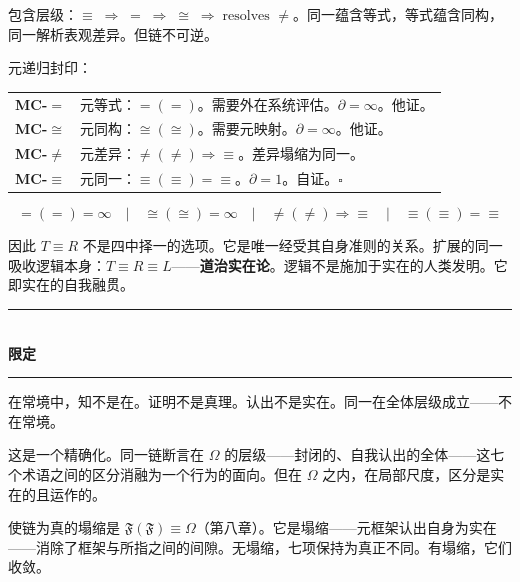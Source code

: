\documentclass[10pt, openany, oneside]{book}
\renewcommand{\normalsize}{\fontsize{10}{13}\selectfont}
\renewcommand{\footnotesize}{\fontsize{8.5}{11}\selectfont}
\begin{document}
\vspace{0.8em}

\noindent 包含层级：$\equiv \;\Rightarrow\; = \;\Rightarrow\; \cong \;\Rightarrow\; \text{resolves } \neq$。同一蕴含等式，等式蕴含同构，同一解析表观差异。但链不可逆。

元递归封印：

{\footnotesize
\noindent\begin{tabular}{r p{}}
\textbf{MC-$=$} & 元等式：$=(=)$。需要外在系统评估。$\partial = \infty$。他证。\\[0.3em]
\textbf{MC-$\cong$} & 元同构：$\cong(\cong)$。需要元映射。$\partial = \infty$。他证。\\[0.3em]
\textbf{MC-$\neq$} & 元差异：$\neq(\neq) \Rightarrow \equiv$。差异塌缩为同一。\\[0.3em]
\textbf{MC-$\equiv$} & 元同一：$\equiv(\equiv) = \equiv$。$\partial = 1$。自证。$\square$ \\[0.3em]
\end{tabular}
}

$$\boxed{=(=) = \infty \quad | \quad \cong(\cong) = \infty \quad | \quad \neq(\neq) \Rightarrow \equiv \quad | \quad \equiv(\equiv) = \equiv}$$

因此 $T \equiv R$ 不是四中择一的选项。它是唯一经受其自身准则的关系。扩展的同一吸收逻辑本身：$T \equiv R \equiv L$——\textbf{道治实在论}。逻辑不是施加于实在的人类发明。它即实在的自我融贯。

\vspace{1.5em}


\begin{center}
    \rule{0.3\textwidth}{0.4pt}\\[0.5em]
    {\normalsize\bfseries\scshape 限定}\\[0.3em]
    \rule{0.3\textwidth}{0.4pt}
\end{center}

\vspace{1em}

\noindent 在常境中，知不是在。证明不是真理。认出不是实在。同一在全体层级成立——不在常境。

这是一个精确化。同一链断言在 $\Omega$ 的层级——封闭的、自我认出的全体——这七个术语之间的区分消融为一个行为的面向。但在 $\Omega$ 之内，在局部尺度，区分是实在的且运作的。

使链为真的塌缩是 $\mathfrak{F}(\mathfrak{F}) \equiv \Omega$（第八章）。它是塌缩——元框架认出自身为实在——消除了框架与所指之间的间隙。无塌缩，七项保持为真正不同。有塌缩，它们收敛。
\end{document}

